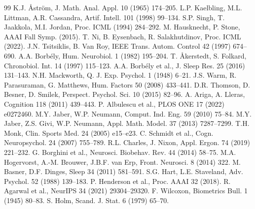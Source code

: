 \documentclass[11pt]{article}
\begin{document}
\begin{thebibliography}{99}\small
{} K.J. {\AA}str{\"o}m, J. Math. Anal. Appl. 10 (1965) 174--205.
 L.P. Kaelbling, M.L. Littman, A.R. Cassandra, Artif. Intell. 101 (1998) 99--134.
 S.P. Singh, T. Jaakkola, M.I. Jordan, Proc. ICML (1994) 284--292.
 M. Hausknecht, P. Stone, AAAI Fall Symp. (2015).
 T. Ni, B. Eysenbach, R. Salakhutdinov, Proc. ICML (2022).
 J.N. Tsitsiklis, B. Van Roy, IEEE Trans. Autom. Control 42 (1997) 674--690.
 A.A. Borb{\'e}ly, Hum. Neurobiol. 1 (1982) 195--204.
 T. {\AA}kerstedt, S. Folkard, Chronobiol. Int. 14 (1997) 115--123.
 A.A. Borb{\'e}ly et al., J. Sleep Res. 25 (2016) 131--143.
 N.H. Mackworth, Q. J. Exp. Psychol. 1 (1948) 6--21.
 J.S. Warm, R. Parasuraman, G. Matthews, Hum. Factors 50 (2008) 433--441.
 D.R. Thomson, D. Besner, D. Smilek, Perspect. Psychol. Sci. 10 (2015) 82--96.
 A. Ariga, A. Lleras, Cognition 118 (2011) 439--443.
 P. Albulescu et al., PLOS ONE 17 (2022) e0272460.
 M.Y. Jaber, W.P. Neumann, Comput. Ind. Eng. 59 (2010) 75--84.
 M.Y. Jaber, Z.S. Givi, W.P. Neumann, Appl. Math. Model. 37 (2013) 7287--7299.
 T.H. Monk, Clin. Sports Med. 24 (2005) e15--e23.
 C. Schmidt et al., Cogn. Neuropsychol. 24 (2007) 755--789.
 R.L. Charles, J. Nixon, Appl. Ergon. 74 (2019) 221--232.
 G. Borghini et al., Neurosci. Biobehav. Rev. 44 (2014) 58--75.
 M.A. Hogervorst, A.-M. Brouwer, J.B.F. van Erp, Front. Neurosci. 8 (2014) 322.
 M. Basner, D.F. Dinges, Sleep 34 (2011) 581--591.
 S.G. Hart, L.E. Staveland, Adv. Psychol. 52 (1988) 139--183.
 P. Henderson et al., Proc. AAAI 32 (2018).
 R. Agarwal et al., NeurIPS 34 (2021) 29304--29320.
 F. Wilcoxon, Biometrics Bull. 1 (1945) 80--83.
 S. Holm, Scand. J. Stat. 6 (1979) 65--70.
\end{thebibliography}
\end{document}

